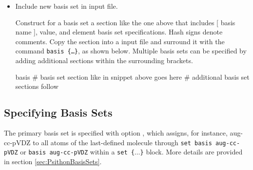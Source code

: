 \begin{itemize}
\item Include new basis set in input file.

Construct for a basis set a section like the one above that includes [ basis name ], 
value, and element basis set specifications. Hash signs denote comments.
Copy the section into a \PSIfour input file and surround it with the command \texttt{basis \{\dots\}}, 
as shown below.
Multiple basis sets can be specified by adding additional sections within the surrounding brackets.
\begin{Snippet}
basis {
# basis set section like in snippet above goes here
# additional basis set sections follow
}
\end{Snippet}
\end{itemize}


\subsection{Specifying Basis Sets}

The primary basis set is specified with option , which assigns,
for instance, aug-cc-pVDZ to all atoms of the last-defined molecule through
\texttt{set basis aug-cc-pVDZ} or \texttt{basis aug-cc-pVDZ} within a \texttt{set \{$\dots$\}} block.  More details are provided in section \ref{sec:PsithonBasisSets}.



